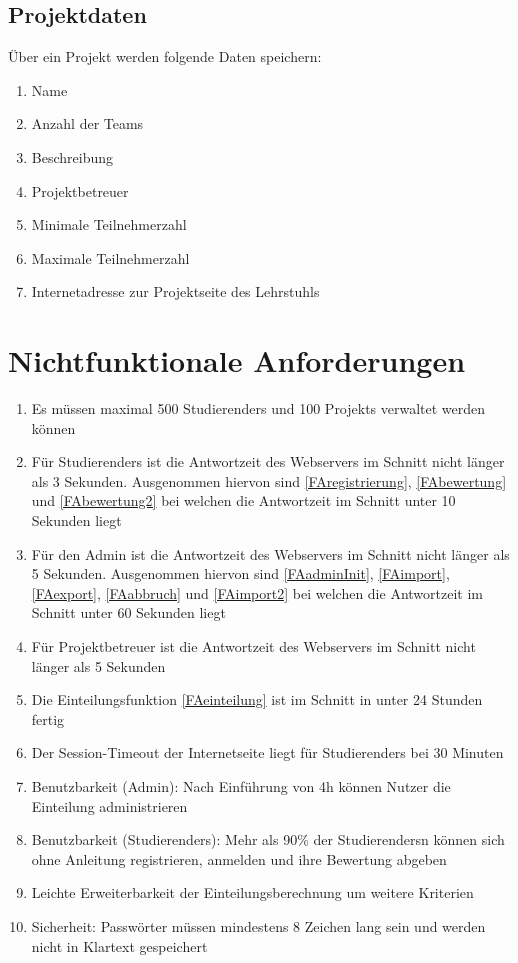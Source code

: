 \documentclass[parskip=full]{scrartcl}
\newcommand{\swtLabel}[1]{\textbf{/#1\arabic*0/}}
\begin{document}
\subsection{Projektdaten}
Über ein \gls{Projekt} werden folgende Daten speichern:
\begin{enumerate}[label=\swtLabel{D},resume] 
  \item Name \label{DProjektAnfang}
  \item Anzahl der \glspl{Team}
  \item Beschreibung
  \item \gls{Projektbetreuer}
  \item Minimale Teilnehmerzahl
  \item Maximale Teilnehmerzahl
  \item Internetadresse zur \gls{Projekt}seite des Lehrstuhls \label{DProjektEnde}
\end{enumerate}



\section{Nichtfunktionale Anforderungen}

\begin{enumerate}[label=\swtLabel{NF}]
  \item Es müssen maximal 500 \glspl{Studierender} und 100 \glspl{Projekt} verwaltet werden
  können
  \item Für \glspl{Studierender} ist die Antwortzeit des Webservers im Schnitt nicht
  länger als 3 Sekunden. Ausgenommen hiervon sind \ref{FAregistrierung}, 
  \ref{FAbewertung} und \ref{FAbewertung2} bei welchen die Antwortzeit im
  Schnitt unter 10 Sekunden liegt
  \item Für den \gls{Admin} ist die Antwortzeit des Webservers im Schnitt nicht
  länger als 5 Sekunden. Ausgenommen hiervon sind \ref{FAadminInit}, \ref{FAimport},
  \ref{FAexport}, \ref{FAabbruch} und \ref{FAimport2} bei welchen die Antwortzeit im Schnitt
  unter 60 Sekunden liegt
  \item Für \gls{Projektbetreuer} ist die Antwortzeit des Webservers im Schnitt nicht
  länger als 5 Sekunden
  \item Die \gls{Einteilung}sfunktion \ref{FAeinteilung} ist im Schnitt in unter 24
  Stunden fertig
	\item Der Session-Timeout der Internetseite liegt für \glspl{Studierender} bei 30
	Minuten
	\item Benutzbarkeit (\gls{Admin}): Nach Einführung von 4h können Nutzer die
	\gls{Einteilung} administrieren
	\item Benutzbarkeit (\glspl{Studierender}): Mehr als 90\% der \glspl{Studierender}n können
	sich ohne Anleitung registrieren, anmelden und ihre \gls{Bewertung} abgeben
	\item Leichte Erweiterbarkeit der \gls{Einteilung}sberechnung um weitere Kriterien
	\item Sicherheit: Passwörter müssen mindestens 8 Zeichen lang sein und werden
	nicht in Klartext gespeichert
 

\end{enumerate}
\end{document}
